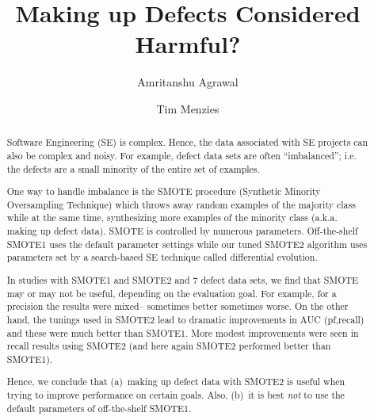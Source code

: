 \documentclass[sigconf]{acmart}
\theoremstyle{break}
\begin{document}
\pagestyle{plain}

\title{Making up Defects  Considered Harmful?}

\author{Amritanshu Agrawal}

\author{Tim Menzies}



\begin{abstract}
Software Engineering (SE) is complex. Hence, the data associated with SE projects can also be   complex and noisy. For example, defect data sets are often ``imbalanced''; i.e. the defects are a small minority of the entire set of examples.

One way to handle imbalance is the  SMOTE procedure (Synthetic Minority Oversampling Technique) which
throws away random examples of the majority
class while at the same time, synthesizing
more examples 
of the minority class (a.k.a. making up defect data). 
SMOTE  is controlled by numerous
parameters.       Off-the-shelf SMOTE1  uses the default
parameter settings while our tuned SMOTE2 algorithm
uses
parameters set by a search-based SE technique
called differential evolution. 

In studies with SMOTE1 and SMOTE2 and
 7 defect data sets, we find that SMOTE may or may not be useful, depending on  the evaluation goal. For example,
 for a precision the results were mixed-- sometimes better sometimes worse.
On the other hand, the tunings
used in SMOTE2 lead to dramatic improvements in  AUC (pf,recall) and these were much better than SMOTE1. More modest improvements were seen in recall results using SMOTE2 (and here again  SMOTE2 performed better than SMOTE1).

Hence, we conclude that (a)~making up defect data with SMOTE2 is useful when trying to improve performance on certain goals. Also, (b)~it is best {\em not} to use the default parameters of off-the-shelf SMOTE1.
\end{abstract}


\maketitle
\end{document}
